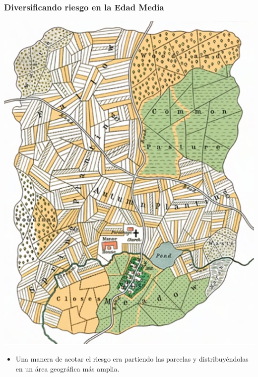 \documentclass{beamer}
\begin{document}
\begin{frame}
\frametitle{Diversificando riesgo en la Edad Media}
\centering
\includegraphics[scale=0.4]{../Figures/C19.16.png}

\begin{itemize}
    \item Una manera de acotar el riesgo era partiendo las parcelas y distribuyéndolas en un área geográfica más amplia. 
\end{itemize}
\end{frame}
\end{document}
